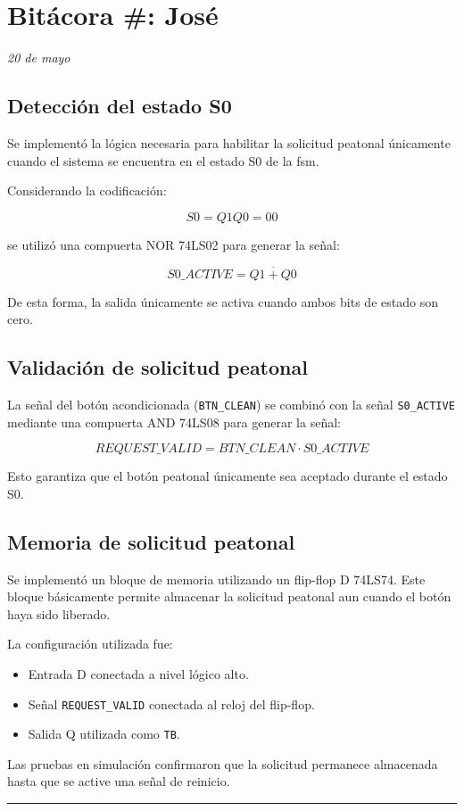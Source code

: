 \documentclass[11pt]{article}
\newcounter{entrycount}
\newcommand{\logentry}[3]{%
  \refstepcounter{entrycount}%
  \section*{Bitácora \#\theentrycount: #1}%
  \hfill\textit{#2}\\[0.2cm]
  #3
  \vspace{0.5cm}
  \hrule
  \vspace{0.5cm}
}
\begin{document}
\logentry{José}{20 de mayo}{
\subsection{Detección del estado S0}

Se implementó la lógica necesaria para habilitar la solicitud peatonal únicamente cuando el sistema se encuentra en el estado S0 de la fsm.

Considerando la codificación:

\[
S0 = Q1Q0 = 00
\]

se utilizó una compuerta NOR 74LS02 para generar la señal:

\[
S0\_ACTIVE = \overline{Q1 + Q0}
\]

De esta forma, la salida únicamente se activa cuando ambos bits de estado son cero.

\subsection{Validación de solicitud peatonal}

La señal del botón acondicionada (\texttt{BTN\_CLEAN}) se combinó con la señal \texttt{S0\_ACTIVE} mediante una compuerta AND 74LS08 para generar la señal:

\[
REQUEST\_VALID = BTN\_CLEAN \cdot S0\_ACTIVE
\]

Esto garantiza que el botón peatonal únicamente sea aceptado durante el estado S0.

\subsection{Memoria de solicitud peatonal}

Se implementó un bloque de memoria utilizando un flip-flop D 74LS74. Este bloque básicamente permite almacenar la solicitud peatonal aun cuando el botón haya sido liberado.

La configuración utilizada fue:

\begin{itemize}
    \item Entrada D conectada a nivel lógico alto.
    \item Señal \texttt{REQUEST\_VALID} conectada al reloj del flip-flop.
    \item Salida Q utilizada como \texttt{TB}.
\end{itemize}

Las pruebas en simulación confirmaron que la solicitud permanece almacenada hasta que se active una señal de reinicio.

}
\end{document}
